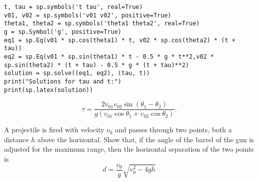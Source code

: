 \begin{solution}{6.55}
\begin{lstlisting}[language=iPython]
t, tau = sp.symbols('t tau', real=True)
v01, v02 = sp.symbols('v01 v02', positive=True)
theta1, theta2 = sp.symbols('theta1 theta2', real=True)
g = sp.Symbol('g', positive=True)
eq1 = sp.Eq(v01 * sp.cos(theta1) * t, v02 * sp.cos(theta2) * (t + tau))
eq2 = sp.Eq(v01 * sp.sin(theta1) * t - 0.5 * g * t**2,v02 * sp.sin(theta2) * (t + tau) - 0.5 * g * (t + tau)**2)
solution = sp.solve((eq1, eq2), (tau, t))
print("Solutions for tau and t:")
print(sp.latex(solution))
\end{lstlisting}

\[
\tau = \frac{2 v_{01} v_{02} \sin \left(\theta_1-\theta_2\right)}{g\left(v_{01} \cos \theta_1+v_{02} \cos \theta_2\right)}.
\]

\end{solution}

\begin{problem}{6.56}
A projectile is fired with velocity \(v_0\) and passes through two points, both a distance \(h\) above the horizontal. Show that, if the angle of the barrel of the gun is adjusted for the maximum range, then the horizontal separation of the two points is
\[
d=\frac{v_0}{g} \sqrt{v_0^2-4 g h}
\]
\end{problem}

